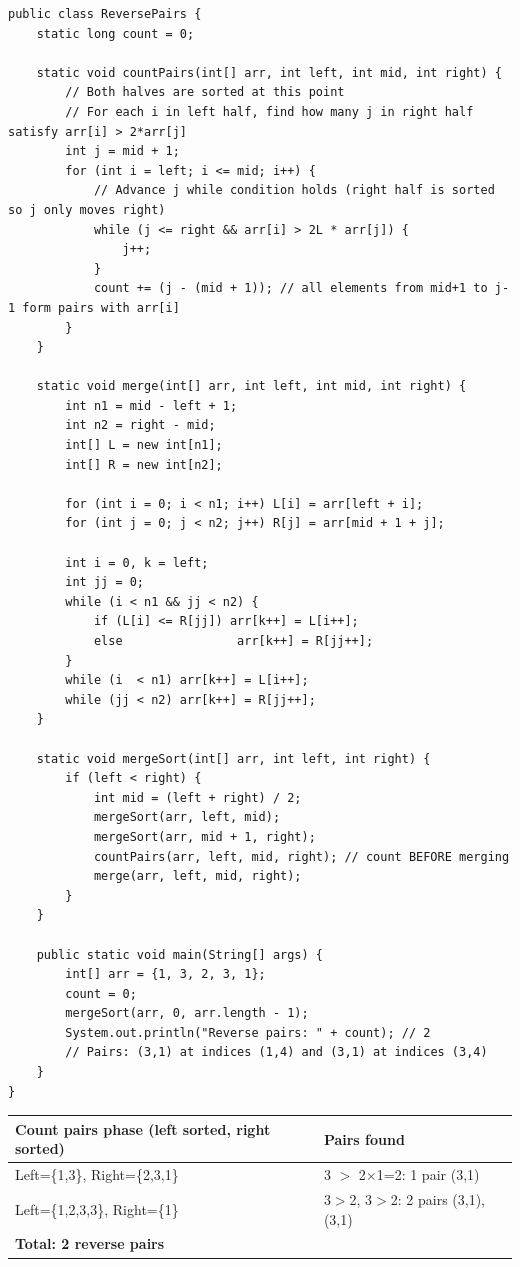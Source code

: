 \documentclass[12pt,a4paper,oneside]{book}
\begin{document}
\begin{lstlisting}[caption={Reverse Pairs --- Modified Merge Sort, O(n log n)}]
public class ReversePairs {
    static long count = 0;

    static void countPairs(int[] arr, int left, int mid, int right) {
        // Both halves are sorted at this point
        // For each i in left half, find how many j in right half satisfy arr[i] > 2*arr[j]
        int j = mid + 1;
        for (int i = left; i <= mid; i++) {
            // Advance j while condition holds (right half is sorted so j only moves right)
            while (j <= right && arr[i] > 2L * arr[j]) {
                j++;
            }
            count += (j - (mid + 1)); // all elements from mid+1 to j-1 form pairs with arr[i]
        }
    }

    static void merge(int[] arr, int left, int mid, int right) {
        int n1 = mid - left + 1;
        int n2 = right - mid;
        int[] L = new int[n1];
        int[] R = new int[n2];

        for (int i = 0; i < n1; i++) L[i] = arr[left + i];
        for (int j = 0; j < n2; j++) R[j] = arr[mid + 1 + j];

        int i = 0, k = left;
        int jj = 0;
        while (i < n1 && jj < n2) {
            if (L[i] <= R[jj]) arr[k++] = L[i++];
            else                arr[k++] = R[jj++];
        }
        while (i  < n1) arr[k++] = L[i++];
        while (jj < n2) arr[k++] = R[jj++];
    }

    static void mergeSort(int[] arr, int left, int right) {
        if (left < right) {
            int mid = (left + right) / 2;
            mergeSort(arr, left, mid);
            mergeSort(arr, mid + 1, right);
            countPairs(arr, left, mid, right); // count BEFORE merging
            merge(arr, left, mid, right);
        }
    }

    public static void main(String[] args) {
        int[] arr = {1, 3, 2, 3, 1};
        count = 0;
        mergeSort(arr, 0, arr.length - 1);
        System.out.println("Reverse pairs: " + count); // 2
        // Pairs: (3,1) at indices (1,4) and (3,1) at indices (3,4)
    }
}
\end{lstlisting}

\begin{dryrun}[arr = \{1, 3, 2, 3, 1\}]
\begin{center}
\begin{tabular}{ll}
\toprule
\textbf{Count pairs phase (left sorted, right sorted)} & \textbf{Pairs found}\\
\midrule
Left=\{1,3\}, Right=\{2,3,1\} & 3 $>$ 2×1=2: 1 pair (3,1)\\
Left=\{1,2,3,3\}, Right=\{1\} & 3$>$2, 3$>$2: 2 pairs (3,1),(3,1)\\
\midrule
\multicolumn{2}{l}{\textbf{Total: 2 reverse pairs}}\\
\bottomrule
\end{tabular}
\end{center}
\end{dryrun}
\end{document}
